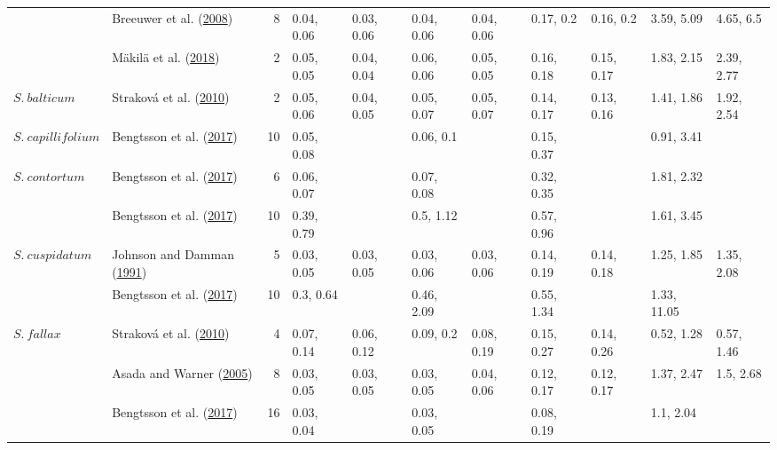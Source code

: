\documentclass[
  12pt,
]{article}
\begin{document}
\begin{table}[H]
{\begin{tabular}[t]{llrllllllll}
 & Breeuwer et al. (\protect\hyperlink{ref-Breeuwer.2008}{2008}) & 8 & 0.04, 0.06 & 0.03, 0.06 & 0.04, 0.06 & 0.04, 0.06 & 0.17, 0.2 & 0.16, 0.2 & 3.59, 5.09 & 4.65, 6.5\\

 & Mäkilä et al. (\protect\hyperlink{ref-Makila.2018}{2018}) & 2 & 0.05, 0.05 & 0.04, 0.04 & 0.06, 0.06 & 0.05, 0.05 & 0.16, 0.18 & 0.15, 0.17 & 1.83, 2.15 & 2.39, 2.77\\

\multirow[t]{-4}{*}{\raggedright\arraybackslash $S.~balticum$} & Straková et al. (\protect\hyperlink{ref-Strakova.2010}{2010}) & 2 & 0.05, 0.06 & 0.04, 0.05 & 0.05, 0.07 & 0.05, 0.07 & 0.14, 0.17 & 0.13, 0.16 & 1.41, 1.86 & 1.92, 2.54\\
\cmidrule{1-11}
$S.~capillifolium$ & Bengtsson et al. (\protect\hyperlink{ref-Bengtsson.2017}{2017}) & 10 & 0.05, 0.08 &  & 0.06, 0.1 &  & 0.15, 0.37 &  & 0.91, 3.41 & \\
\cmidrule{1-11}
$S.~contortum$ & Bengtsson et al. (\protect\hyperlink{ref-Bengtsson.2017}{2017}) & 6 & 0.06, 0.07 &  & 0.07, 0.08 &  & 0.32, 0.35 &  & 1.81, 2.32 & \\
\cmidrule{1-11}
 & Bengtsson et al. (\protect\hyperlink{ref-Bengtsson.2017}{2017}) & 10 & 0.39, 0.79 &  & 0.5, 1.12 &  & 0.57, 0.96 &  & 1.61, 3.45 & \\

\multirow[t]{-2}{*}{\raggedright\arraybackslash $S.~cuspidatum$} & Johnson and Damman (\protect\hyperlink{ref-Johnson.1991}{1991}) & 5 & 0.03, 0.05 & 0.03, 0.05 & 0.03, 0.06 & 0.03, 0.06 & 0.14, 0.19 & 0.14, 0.18 & 1.25, 1.85 & 1.35, 2.08\\
\cmidrule{1-11}
 & Bengtsson et al. (\protect\hyperlink{ref-Bengtsson.2017}{2017}) & 10 & 0.3, 0.64 &  & 0.46, 2.09 &  & 0.55, 1.34 &  & 1.33, 11.05 & \\

\multirow[t]{-2}{*}{\raggedright\arraybackslash $S.~fallax$} & Straková et al. (\protect\hyperlink{ref-Strakova.2010}{2010}) & 4 & 0.07, 0.14 & 0.06, 0.12 & 0.09, 0.2 & 0.08, 0.19 & 0.15, 0.27 & 0.14, 0.26 & 0.52, 1.28 & 0.57, 1.46\\
\cmidrule{1-11}
 & Asada and Warner (\protect\hyperlink{ref-Asada.2005b}{2005}) & 8 & 0.03, 0.05 & 0.03, 0.05 & 0.03, 0.05 & 0.04, 0.06 & 0.12, 0.17 & 0.12, 0.17 & 1.37, 2.47 & 1.5, 2.68\\

 & Bengtsson et al. (\protect\hyperlink{ref-Bengtsson.2017}{2017}) & 16 & 0.03, 0.04 &  & 0.03, 0.05 &  & 0.08, 0.19 &  & 1.1, 2.04 & \\


\end{tabular}}
\end{table}
\end{document}

